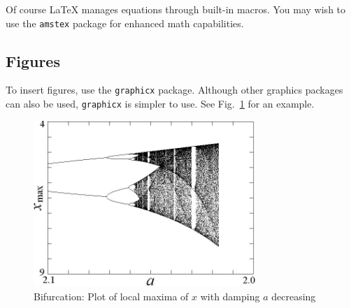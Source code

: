 \documentclass{ifacconf}
\begin{document}

Of course LaTeX manages equations through built-in macros. You may
wish to use the \texttt{amstex} package for enhanced math
capabilities.

\subsection{Figures}

To insert figures, use the \texttt{graphicx} package. Although other
graphics packages can also be used, \texttt{graphicx} is simpler to
use. See  Fig.~\ref{fig:bifurcation} for an example.

\begin{figure}
\begin{center}
\includegraphics[width=8.4cm]{bifurcation}    %
\caption{Bifurcation: Plot of local maxima of $x$ with damping $a$ decreasing} 
\label{fig:bifurcation}
\end{center}
\end{figure}
\end{document}
